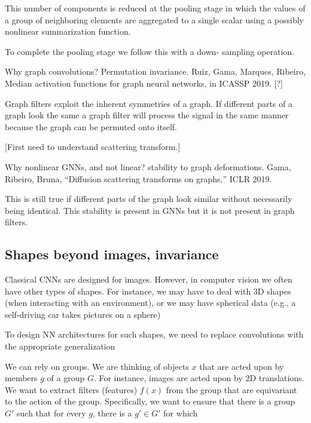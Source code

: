 \documentclass[english]{article}
\begin{document}
This number of components is reduced at the pooling stage in which the values of a group of neighboring elements are aggregated to a single
scalar using a possibly nonlinear summarization function.


To complete the pooling stage we follow this with a down-
sampling operation.



\item  Why graph convolutions? Permutation invariance. Ruiz, Gama, Marques, Ribeiro, Median activation functions for graph neural networks, in ICASSP 2019. [?]

Graph filters exploit the inherent symmetries of a graph. If different parts
of a graph look the same a graph filter will process the signal in the same manner because the graph can be
permuted onto itself. 

[First need to understand scattering transform.]

\item 

Why nonlinear GNNs, and not linear?  stability to graph deformations. 
Gama, Ribeiro, Bruna, “Diffusion scattering transforms on graphs,” ICLR 2019.

This is still true if different parts of the graph look
similar without necessarily being identical. This stability is present in GNNs but it is not present in graph
filters. 


\eitem 


\subsection{Shapes beyond images, invariance}
%
\bitem
\item Classical CNNs are designed for images. However, in computer vision we often have other types of shapes. For instance, we may have to deal with 3D shapes (when interacting with an environment), or we may have spherical data (e.g., a self-driving car takes pictures on a sphere)

\item To design NN architectures for such shapes, we need to replace convolutions with the appropriate generalization

\item We can rely on groups. We are thinking of objects $x$ that are acted upon by members $g$ of a group $G$. For instance, images are acted upon by 2D translations. We want to extract filters (features) $f(x)$ from the group that are equivariant to the action of the group. Specifically, we want to ensure that there is a group $G'$ such that for every $g$, there is a $g'\in G'$ for which
\end{document}
